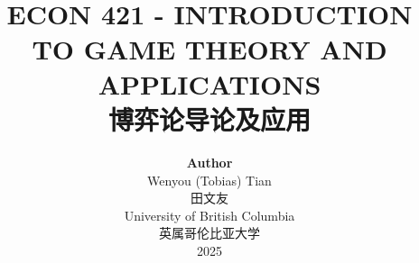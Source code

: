\title{ \normalsize \textsc{}
		\\ [2.0cm]
		\HRule{1.5pt} \\
		\LARGE \textbf{\uppercase{ECON 421 - Introduction to Game Theory and Applications}
		\HRule{2.0pt} \\ [0.6cm] \LARGE{博弈论导论及应用} \vspace*{10\baselineskip}}
		}
\date{}
\author{\textbf{Author} \\ 
		Wenyou (Tobias) Tian \\
        田文友 \\
		University of British Columbia \\
        英属哥伦比亚大学 \\
		2025}

\maketitle
\newpage

\tableofcontents
\newpage
